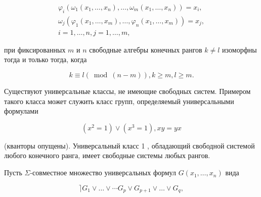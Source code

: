 \documentclass[10pt]{article}
\begin{document}
\[

\begin{gathered}

\varphi_{i}\left(\omega_{1}\left(x_{1}, \ldots, x_{n}\right), \ldots, \omega_{m}\left(x_{1}, \ldots, x_{n}\right)\right)=x_{i}, \\

\omega_{j}\left(\varphi_{1}\left(x_{1}, \ldots, x_{m}\right), \ldots, \varphi_{n}\left(x_{1}, \ldots, x_{m}\right)\right)=x_{j}, \\

i=1, \ldots, n, j=1, \ldots, m,

\end{gathered}

\]



при фиксированных $m$ и $n$ свободные алгебры конечных рангов $k \neq l$ изоморфны тогда и только тогда, когда



\[

k \equiv l(\bmod (n-m)), k \geqslant m, l \geqslant m .

\]



Существуют универсальные классы, не имеющие свободных систем. Примером такого класса может служить класс групп, определяемый универсальными формулами



\[

\left(x^{2}=1\right) \vee\left(x^{3}=1\right), x y=y x

\]



(кванторы опущены). Универсальный класс 1 , обладающий свободной системой любого конечного ранга, имеет свободные системы любых рангов.



Пусть $\Sigma$-совместное множество универсальных формул $G\left(x_{1}, \ldots, x_{n}\right)$ вида



\[

\rceil G_{1} \vee \ldots \vee \cdots G_{p} \vee G_{p+1} \vee \ldots \vee G_{q},

\]
\end{document}
